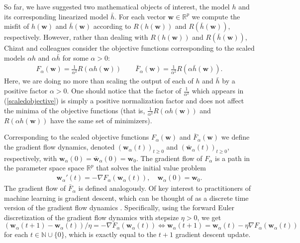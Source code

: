\documentclass{article}
\begin{document}
So far, we have suggested two mathematical objects of interest, the model $h$ and its corresponding linearized model $\bar{h}$. For each vector $\boldsymbol{w} \in \mathbb{R}^p$ we compute the misfit of $h(\boldsymbol{w})$ and $\bar{h}(\boldsymbol{w})$ according to $R(h(\boldsymbol{w}))$ and $R(\bar{h}(\boldsymbol{w}))$, respectively. However, rather than dealing with $R(h(\boldsymbol{w}))$ and $R(\bar{h}(\boldsymbol{w}))$, Chizat and colleagues consider the objective functions corresponding to the scaled models $\alpha h$ and $\alpha \bar{h}$ for some $\alpha > 0$:
\begin{align}
    F_{\alpha}(\boldsymbol{w}) = \frac{1}{\alpha^2}R(\alpha h(\boldsymbol{w})) \qquad
    \bar{F}_{\alpha}(\boldsymbol{w}) = \frac{1}{\alpha^2}R(\alpha \bar{h}(\boldsymbol{w}))\label{scaledobjective}.
\end{align}
Here, we are doing no more than scaling the output of each of $h$ and $\bar{h}$ by a positive factor $\alpha > 0$. One should notice that the factor of  $\frac{1}{\alpha^2}$ which appears in (\ref{scaledobjective}) is simply a positive normalization factor and does not affect the minima of the objective functions (that is, $\frac{1}{\alpha^2}R(\alpha h(\boldsymbol{w}))$ and $R(\alpha h(\boldsymbol{w}))$ have the same set of minimizers).

Corresponding to the scaled objective functions $F_{\alpha}(\boldsymbol{w})$ and $\bar{F}_{\alpha}(\boldsymbol{w})$ we define the gradient flow dynamics, denoted $(\boldsymbol{w}_{\alpha}(t))_{t \geq 0}$ and $(\boldsymbol{\bar{w}}_{\alpha}(t))_{t \geq 0}$, respectively, with $\boldsymbol{w}_{\alpha}(0) = \boldsymbol{\bar{w}}_{\alpha}(0) = \boldsymbol{w}_0$. The gradient flow of $F_{\alpha}$ is a path in the parameter space space $\mathbb{R}^p$ that solves the initial value problem
\begin{align}\label{gradflow}
    \boldsymbol{w}_{\alpha}'(t) = - \nabla F_{\alpha}(\boldsymbol{w}_{\alpha}(t)), \quad \boldsymbol{w}_{\alpha}(0) = \boldsymbol{w}_0.
\end{align}
The gradient flow of $\bar{F}_{\alpha}$ is defined analogously. Of key interest to practitioners of machine learning is gradient descent, which can be thought of as a discrete time version of the gradient flow dynamics \cite{wibisono2016}. Specifically, using the forward Euler discretization of the  gradient flow dynamics with stepsize $\eta > 0$, we get $(\boldsymbol{w}_{\alpha}(t + 1) - \boldsymbol{w}_{\alpha}(t))/ \eta = - \nabla  F_{\alpha}(\boldsymbol{w}_{\alpha}(t)) \Leftrightarrow \boldsymbol{w}_{\alpha}(t + 1) = \boldsymbol{w}_{\alpha}(t) - \eta \nabla F_{\alpha}(\boldsymbol{w}_{\alpha}(t))$ for each $t \in \mathbb{N} \cup \{0\}$, which is exactly equal to the $t+1$ gradient descent update.
\end{document}
